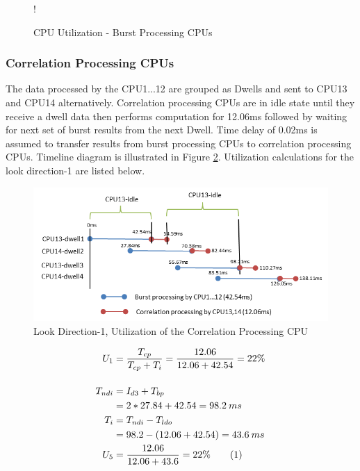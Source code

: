 \begin{figure}[h!]
\centering
\resizebox {10cm} {!} {
}
\caption{CPU Utilization - Burst Processing CPUs}
\label{sch4:chrt:cpu_util}
\end{figure}

\subsubsection{Correlation Processing CPUs} 
The data processed by the CPU1...12 are grouped as Dwells and sent to CPU13 and CPU14 alternatively. Correlation processing CPUs are in idle state until they receive a dwell data then performs computation for 12.06ms followed by waiting for next set of burst results from the next Dwell. Time delay of 0.02ms is assumed to transfer results from burst processing CPUs to correlation processing CPUs. Timeline diagram is illustrated in Figure \ref{fig:mm:scheme5_corr_timeline}. Utilization calculations for the look direction-1 are listed below. 

\begin{figure}[h!]
	\centering
	\includegraphics[]{figures/scheme5_corr_timeline}
	\caption{Look Direction-1, Utilization of the Correlation Processing CPU}
	\label{fig:mm:scheme5_corr_timeline}
\end{figure}

\begin{align*}
	U_{1} &= \frac{T_{cp}}{ T_{cp} + T_{i}} =  \frac{12.06}{12.06 + 42.54} = 22\% \\[0.4cm]
	T_{ndi} &= I_{d3} + T_{bp} \\
	&= 2 * 27.84 + 42.54 = 98.2 \: ms\\
	T_{i} &= T_{ndi} - T_{ldo} \\
	&= 98.2 - (12.06 + 42.54) = 43.6 \: ms \\
	U_{5} &= \frac{12.06}{12.06 + 43.6} = 22\%   \stepcounter{equation}\tag{\theequation}
\end{align*}

